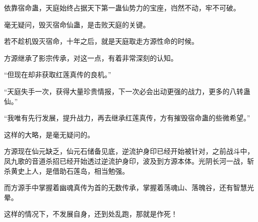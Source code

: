 \begin{this_body}
依靠宿命蛊，天庭始终占据天下第一蛊仙势力的宝座，岿然不动，牢不可破。

毫无疑问，毁灭宿命仙蛊，是击败天庭的关键。

若不趁机毁灭宿命，十年之后，就是天庭取走方源性命的时候。

方源继承了影宗传承，对这一点，有着非常深刻的认知。

“但现在却非获取红莲真传的良机。”

“天庭失手一次，获得大量珍贵情报，下一次必会出动更强的战力，更多的八转蛊仙。”

“我唯有先行发展，提升战力，再去继承红莲真传，方有摧毁宿命蛊的些微希望。”

这样的大略，是毫无疑问的。

方源现在仙元缺乏，仙元石储备见底，逆流护身印已经开始被针对，之前战斗中，凤九歌的音道杀招已经开始透过逆流护身印，波及到方源本体。光阴长河一战，斩杀黄史上人，是借助石莲岛，相当勉强。

而方源手中掌握着幽魂真传为首的无数传承，掌握着荡魂山、落魄谷，还有智慧光晕。

这样的情况下，不发展自身，还到处乱跑，那就是作死！

\end{this_body}

